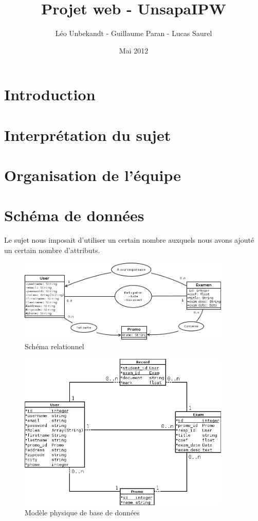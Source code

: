 \documentclass{report}
\author{Léo Unbekandt - Guillaume Paran - Lucas Saurel}
\date{Mai 2012}
\title{Projet web - UnsapaIPW}
\begin{document}
  \maketitle
  \tableofcontents

  \section*{Introduction}

  \section{Interprétation du sujet}
  \section{Organisation de l'équipe}
  \section{Schéma de données}
    Le sujet nous imposait d'utiliser un certain nombre
    auxquels nous avons ajouté un certain nombre d'attributs.

    \begin{figure}
      \caption{Schéma relationnel}
      \includegraphics[width=0.9\textwidth]{./data.png}
    \end{figure}

    \begin{figure}
      \caption{Modèle physique de base de données}
      \includegraphics[width=0.9\textwidth]{./db.png}
    \end{figure}
\end{document}
